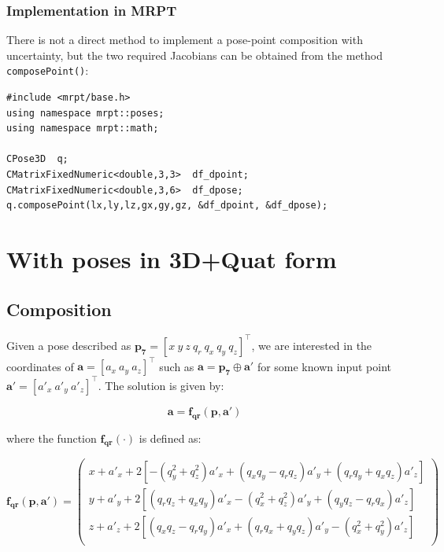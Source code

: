 \documentclass[a4paper,11pt]{report}
\begin{document}
\subsubsection{Implementation in MRPT}

There is not a direct method to implement a pose-point composition with uncertainty, 
but the two required Jacobians can be obtained from the method \texttt{composePoint()}:

\begin{lstlisting}
#include <mrpt/base.h> 
using namespace mrpt::poses; 
using namespace mrpt::math; 

CPose3D  q;
CMatrixFixedNumeric<double,3,3>  df_dpoint;
CMatrixFixedNumeric<double,3,6>  df_dpose;
q.composePoint(lx,ly,lz,gx,gy,gz, &df_dpoint, &df_dpose);
\end{lstlisting}



\section{With poses in 3D+Quat form}

\subsection{Composition}

Given a pose described as $\mathbf{p_7} = [x ~ y ~ z ~  q_r ~ q_x ~ q_y ~ q_z ] ^ \top$, 
we are interested in the coordinates of $\mathbf{a}=[a_x ~ a_y ~ a_z]^\top$ such as
$\mathbf{a} = \mathbf{p_7} \oplus \mathbf{a'}$ for some known input point 
$\mathbf{a'} = [a'_x ~ a'_y ~ a'_z]^\top$. 
The solution is given by:

\begin{equation}
\mathbf{a} = \mathbf{f_{qr}} (\mathbf{p},\mathbf{a'})
\end{equation}

\noindent where the function $\mathbf{f_{qr}}(\cdot)$ is defined as:

\begin{equation}
\mathbf{f_{qr}} (\mathbf{p},\mathbf{a'}) = 
 \left(
\begin{array}{c}
 x + a'_x + 2 \left[-(q_y^2+ q_z^2) a'_x +(q_x q_y - q_r q_z) a'_y+(q_r q_y+q_x q_z) a'_z \right]  \\
 y + a'_y + 2 \left[(q_r q_z+  q_x q_y) a'_x-(q_x^2 +q_z^2) a'_y+(q_y q_z-q_r q_x) a'_z \right] \\
 z + a'_z + 2 \left[(q_x q_z-  q_r q_y) a'_x+(q_r q_x + q_y q_z) a'_y-(q_x^2+q_y^2) a'_z \right]  \\
\end{array}
\right)
\label{eq:quat_rot_point_func}
\end{equation}
\end{document}
